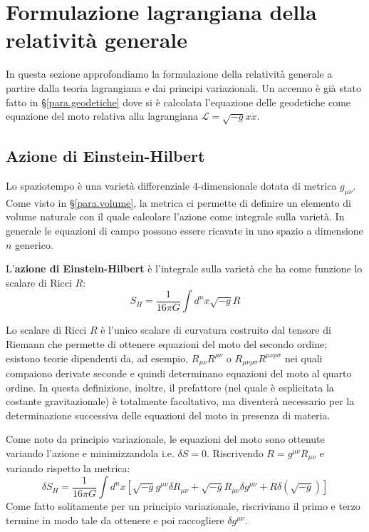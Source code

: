 \chapter{Formulazione lagrangiana della relatività generale}In questa sezione approfondiamo la formulazione della relatività generale a partire dalla teoria lagrangiana e dai principi variazionali. Un accenno è già stato fatto in \S\ref{para.geodetiche} dove si è calcolata l'equazione delle geodetiche come equazione del moto relativa alla lagrangiana $\mathcal{L} = \sqrt{-g}\dot{x}\dot{x}$.

\section{Azione di Einstein-Hilbert}
Lo spaziotempo è una varietà differenziale 4-dimensionale dotata di metrica $g_{\mu\nu}$. Come visto in \S\ref{para.volume}, la metrica ci permette di definire un elemento di volume naturale con il quale calcolare l'azione come integrale sulla varietà.
In generale le equazioni di campo possono essere ricavate in uno spazio a dimensione $n$ generico.

\begin{definizione}
L'\textbf{azione di Einstein-Hilbert} è l'integrale sulla varietà che ha come funzione lo scalare di Ricci $R$:
\begin{equation}
    S_H = \frac{1}{16\pi G} \int d^nx \sqrt{-g} R
    \label{eq.azione_einstein_hilbert}
\end{equation}
\end{definizione}
Lo scalare di Ricci $R$ è l'unico scalare di curvatura costruito dal tensore di Riemann che permette di ottenere equazioni del moto del secondo ordine; esistono teorie dipendenti da, ad esempio, $R_{\mu\nu}R^{\mu\nu}$ o $R_{\mu\nu\rho\sigma}R^{\mu\nu\rho\sigma}$ nei quali compaiono derivate seconde e quindi determinano equazioni del moto al quarto ordine. In questa definizione, inoltre, il prefattore (nel quale è esplicitata la costante gravitazionale) è totalmente facoltativo, ma diventerà necessario per la determinazione successiva delle equazioni del moto in presenza di materia.

Come noto da principio variazionale, le equazioni del moto sono ottenute variando l'azione e minimizzandola i.e. $\delta S = 0$. Riscrivendo $R = g^{\mu\nu}R_{\mu\nu}$ e variando rispetto la metrica:
\begin{equation*}
    \delta S_H = \frac{1}{16\pi G} \int d^n x \left[ \sqrt{-g}g^{\mu\nu} \delta R_{\mu\nu} + \sqrt{-g}R_{\mu\nu}\delta g^{\mu\nu} + R \delta(\sqrt{-g})\right]
\end{equation*}
Come fatto solitamente per un principio variazionale, riscriviamo il primo e terzo termine in modo tale da ottenere e poi raccogliere $\delta g^{\mu\nu}$.

